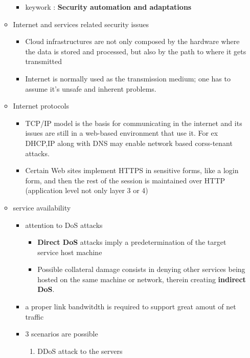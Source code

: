 \documentclass{article}
\begin{document}
\begin{itemize}
\begin{itemize}
\begin{itemize}
            \item keywork : \textbf{Security automation and adaptations}
        \end{itemize}
        \item Internet and services related security issues 
        \begin{itemize}
            \item Cloud infrastructures are not only composed by the hardware where the data is stored and processed, but also by the path to where it gets transmitted
            \item Internet is normally used as the transmission medium; one has to assume it's unsafe and inherent problems.
        \end{itemize}
        \item Internet protocols
        \begin{itemize}
            \item TCP/IP model is the basis for communicating in the internet and its issues are still in a web-based environment that use it. For ex DHCP,IP along with DNS may enable network based corss-tenant attacks.
            \item Certain Web sites implement HTTPS in sensitive forms, like a login form, and then the rest of the session is maintained over HTTP (application level not only layer 3 or 4)           
        \end{itemize}
        \item service availability
        \begin{itemize}
            \item attention to DoS attacks
            \begin{itemize}
                \item \textbf{Direct DoS} attacks imply a predetermination of the target service host machine
                \item Possible collateral damage consists in denying other services being hosted on the same machine or network, therein creating \textbf{indirect DoS}.
            \end{itemize}
            \item a proper link bandwitdth is required to support great amout of net traffic
            \item 3 scenarios are possible
            \begin{enumerate}
                \item DDoS attack to the servers
                \begin{enumerate}

\end{enumerate}
\end{enumerate}
\end{itemize}
\end{itemize}
\end{itemize}
\end{document}
